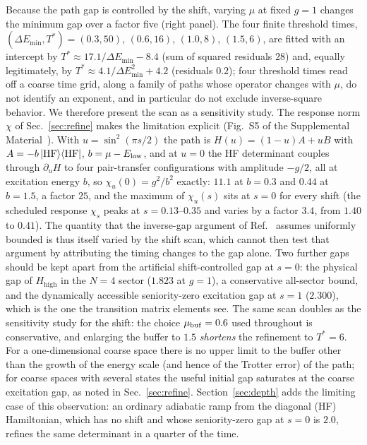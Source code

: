 \documentclass[
  aps,            %
  prc,            %
  reprint,        %
  superscriptaddress,
  floatfix,
  nofootinbib
]{revtex4-2}
\newcommand{\Hhigh}{H_{\mathrm{high}}}
\newcommand{\SM}{Supplemental Material~\cite{SM}}
\begin{document}
Because the path gap is controlled by the shift, varying $\mu$ at fixed $g=1$
changes the minimum gap over a factor five (right panel).  The four finite
threshold times, $(\Delta E_{\min},T^{*})=(0.3,50)$, $(0.6,16)$, $(1.0,8)$,
$(1.5,6)$, are fitted with an intercept by $T^{*}\approx17.1/\Delta E_{\min}-8.4$
(sum of squared residuals $28$) and, equally legitimately, by
$T^{*}\approx4.1/\Delta E_{\min}^{2}+4.2$ (residuals $0.2$); four threshold
times read off a coarse time grid, along a family of paths whose operator
changes with $\mu$, do not identify an exponent, and in particular do not
exclude inverse-square behavior.  We therefore present the scan as a
sensitivity study.  The response norm $\chi$ of Sec.~\ref{sec:refine} makes
the limitation explicit (Fig.~S5 of the \SM{}).  With
$u=\sin^2(\pi s/2)$ the path is $H(u)=(1-u)A+uB$ with
$A=-b\ket{\rm HF}\!\bra{\rm HF}$, $b=\mu-E_{\rm low}$, and at $u=0$ the HF
determinant couples through $\partial_uH$ to four pair-transfer
configurations with amplitude $-g/2$, all at excitation energy $b$, so
$\chi_u(0)=g^2/b^2$ exactly: $11.1$ at $b=0.3$ and $0.44$ at $b=1.5$, a
factor $25$, and the maximum of $\chi_u(s)$ sits at $s=0$ for every shift
(the scheduled response $\chi_s$ peaks at $s=0.13$--$0.35$ and varies by a
factor $3.4$, from $1.40$ to $0.41$).
The quantity that the inverse-gap argument of Ref.~\cite{Bogner2026} assumes
uniformly bounded is thus itself varied by the shift scan, which cannot then
test that argument by attributing the timing changes to the gap alone.  Two
further gaps should be kept apart from the artificial shift-controlled gap
at $s=0$: the physical gap of $\Hhigh$ in the $N=4$ sector ($1.823$ at
$g=1$), a conservative all-sector bound, and the dynamically accessible
seniority-zero excitation gap at $s=1$ ($2.300$), which is the one the
transition matrix elements see.  The same scan doubles as the sensitivity
study for the shift: the choice $\mu_{\rm buf}=0.6$ used throughout is
conservative, and enlarging the buffer to $1.5$ \emph{shortens} the
refinement to $T^{*}=6$.  For a one-dimensional coarse space there is no
upper limit to the buffer other than the growth of the energy scale (and
hence of the Trotter error) of the path; for coarse spaces with several
states the useful initial gap saturates at the coarse excitation gap, as
noted in Sec.~\ref{sec:refine}.  Section~\ref{sec:depth} adds the limiting
case of this observation: an ordinary adiabatic ramp from the diagonal
(HF) Hamiltonian, which has no shift and whose seniority-zero gap at $s=0$
is $2.0$, refines the same determinant in a quarter of the time.
\end{document}
